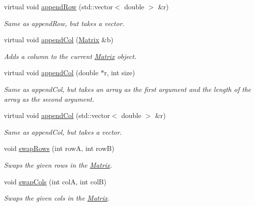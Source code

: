 \begin{DoxyCompactItemize}
virtual void \hyperlink{class_matrix_a934b0686d9a2b971e9740b9a29224a54}{appendRow} (std::vector$<$ double $>$ \&r)
\begin{DoxyCompactList}\small\item\em Same as appendRow, but takes a vector. \item\end{DoxyCompactList}\item 
virtual void \hyperlink{class_matrix_a6d7061bb02cf34f6c79a01ff25b41e84}{appendCol} (\hyperlink{class_matrix}{Matrix} \&b)
\begin{DoxyCompactList}\small\item\em Adds a column to the current \hyperlink{class_matrix}{Matrix} object. \item\end{DoxyCompactList}\item 
virtual void \hyperlink{class_matrix_aae8efe9de26740e3c953e43de55963b2}{appendCol} (double $\ast$r, int size)
\begin{DoxyCompactList}\small\item\em Same as appendCol, but takes an array as the first argument and the length of the array as the second argument. \item\end{DoxyCompactList}\item 
virtual void \hyperlink{class_matrix_a726f7ae83284c090af821752628974af}{appendCol} (std::vector$<$ double $>$ \&r)
\begin{DoxyCompactList}\small\item\em Same as appendCol, but takes a vector. \item\end{DoxyCompactList}\item 
void \hyperlink{class_matrix_ac0e73d5e98817e12b82a3f626c8343de}{swapRows} (int rowA, int rowB)
\begin{DoxyCompactList}\small\item\em Swaps the given rows in the \hyperlink{class_matrix}{Matrix}. \item\end{DoxyCompactList}\item 
void \hyperlink{class_matrix_a505f924baa7c236280751499da56ecee}{swapCols} (int colA, int colB)
\begin{DoxyCompactList}\small\item\em Swaps the given cols in the \hyperlink{class_matrix}{Matrix}. \item\end{DoxyCompactList}\end{DoxyCompactItemize}
